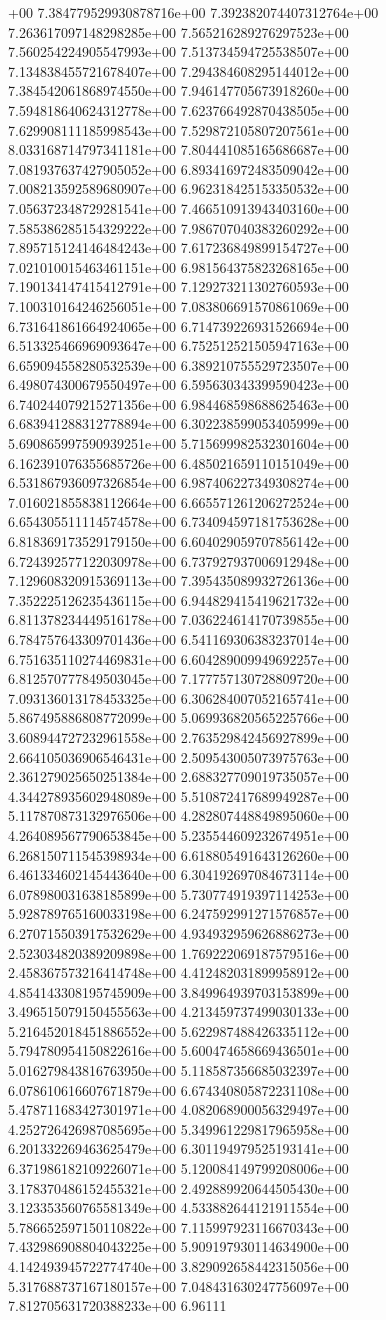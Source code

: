 +00	7.384779529930878716e+00	7.392382074407312764e+00	7.263617097148298285e+00	7.565216289276297523e+00	7.560254224905547993e+00	7.513734594725538507e+00	7.134838455721678407e+00	7.294384608295144012e+00	7.384542061868974550e+00	7.946147705673918260e+00	7.594818640624312778e+00	7.623766492870438505e+00	7.629908111185998543e+00	7.529872105807207561e+00	8.033168714797341181e+00	7.804441085165686687e+00	7.081937637427905052e+00	6.893416972483509042e+00	7.008213592589680907e+00	6.962318425153350532e+00	7.056372348729281541e+00	7.466510913943403160e+00	7.585386285154329222e+00	7.986707040383260292e+00	7.895715124146484243e+00	7.617236849899154727e+00	7.021010015463461151e+00	6.981564375823268165e+00	7.190134147415412791e+00	7.129273211302760593e+00	7.100310164246256051e+00	7.083806691570861069e+00	6.731641861664924065e+00	6.714739226931526694e+00	6.513325466969093647e+00	6.752512521505947163e+00	6.659094558280532539e+00	6.389210755529723507e+00	6.498074300679550497e+00	6.595630343399590423e+00	6.740244079215271356e+00	6.984468598688625463e+00	6.683941288312778894e+00	6.302238599053405999e+00	5.690865997590939251e+00	5.715699982532301604e+00	6.162391076355685726e+00	6.485021659110151049e+00	6.531867936097326854e+00	6.987406227349308274e+00	7.016021855838112664e+00	6.665571261206272524e+00	6.654305511114574578e+00	6.734094597181753628e+00	6.818369173529179150e+00	6.604029059707856142e+00	6.724392577122030978e+00	6.737927937006912948e+00	7.129608320915369113e+00	7.395435089932726136e+00	7.352225126235436115e+00	6.944829415419621732e+00	6.811378234449516178e+00	7.036224614170739855e+00	6.784757643309701436e+00	6.541169306383237014e+00	6.751635110274469831e+00	6.604289009949692257e+00	6.812570777849503045e+00	7.177757130728809720e+00	7.093136013178453325e+00	6.306284007052165741e+00	5.867495886808772099e+00	5.069936820565225766e+00	3.608944727232961558e+00	2.763529842456927899e+00	2.664105036906546431e+00	2.509543005073975763e+00	2.361279025650251384e+00	2.688327709019735057e+00	4.344278935602948089e+00	5.510872417689949287e+00	5.117870873132976506e+00	4.282807448849895060e+00	4.264089567790653845e+00	5.235544609232674951e+00	6.268150711545398934e+00	6.618805491643126260e+00	6.461334602145443640e+00	6.304192697084673114e+00	6.078980031638185899e+00	5.730774919397114253e+00	5.928789765160033198e+00	6.247592991271576857e+00	6.270715503917532629e+00	4.934932959626886273e+00	2.523034820389209898e+00	1.769222069187579516e+00	2.458367573216414748e+00	4.412482031899958912e+00	4.854143308195745909e+00	3.849964939703153899e+00	3.496515079150455563e+00	4.213459737499030133e+00	5.216452018451886552e+00	5.622987488426335112e+00	5.794780954150822616e+00	5.600474658669436501e+00	5.016279843816763950e+00	5.118587356685032397e+00	6.078610616607671879e+00	6.674340805872231108e+00	5.478711683427301971e+00	4.082068900056329497e+00	4.252726426987085695e+00	5.349961229817965958e+00	6.201332269463625479e+00	6.301194979525193141e+00	6.371986182109226071e+00	5.120084149799208006e+00	3.178370486152455321e+00	2.492889920644505430e+00	3.123353560765581349e+00	4.533882644121911554e+00	5.786652597150110822e+00	7.115997923116670343e+00	7.432986908804043225e+00	5.909197930114634900e+00	4.142493945722774740e+00	3.829092658442315056e+00	5.317688737167180157e+00	7.048431630247756097e+00	7.812705631720388233e+00	6.96111